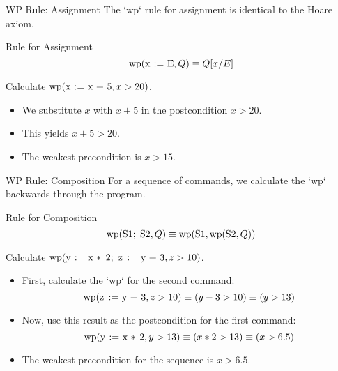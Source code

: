 \documentclass[aspectratio=169]{beamer}
\newcommand{\code}[1]{\lstinline|#1|}
\newcommand{\wpcalc}[2]{\ensuremath{\text{wp}(\code{#1}, #2)}}
\begin{document}
\begin{frame}{WP Rule: Assignment}
    The `wp` rule for assignment is identical to the Hoare axiom.

    \begin{alertblock}{Rule for Assignment}
        \[ \wpcalc{x := E}{Q} \equiv Q[x/E] \]
    \end{alertblock}

    \begin{example}
        Calculate $\wpcalc{x := x + 5}{x > 20}$.
        \begin{itemize}
            \item We substitute $x$ with $x+5$ in the postcondition $x > 20$.
            \item This yields $x + 5 > 20$.
            \item The weakest precondition is $x > 15$.
        \end{itemize}
    \end{example}
\end{frame}

\begin{frame}{WP Rule: Composition}
    For a sequence of commands, we calculate the `wp` backwards through the program.

    \begin{alertblock}{Rule for Composition}
        \[ \wpcalc{S1; S2}{Q} \equiv \wpcalc{S1}{\wpcalc{S2}{Q}} \]
    \end{alertblock}

    \begin{example}
        Calculate $\wpcalc{y := x * 2; z := y - 3}{z > 10}$.
        \begin{itemize}
            \item First, calculate the `wp` for the second command:
            \[ \wpcalc{z := y - 3}{z > 10} \equiv (y - 3 > 10) \equiv (y > 13) \]
            \item Now, use this result as the postcondition for the first command:
            \[ \wpcalc{y := x * 2}{y > 13} \equiv (x * 2 > 13) \equiv (x > 6.5) \]
            \item The weakest precondition for the sequence is $x > 6.5$.
        \end{itemize}
    \end{example}
\end{frame}
\end{document}
